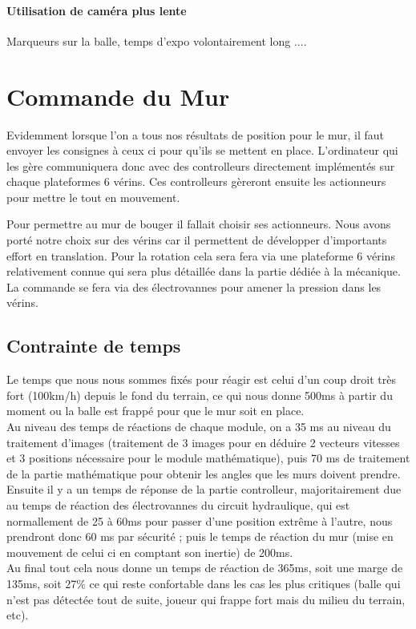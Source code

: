 \subsubsection{Utilisation de caméra plus lente}

Marqueurs sur la balle, temps d'expo volontairement long .... 



\chapter{Commande du Mur}

Evidemment lorsque l'on a tous nos résultats de position pour le mur, il faut envoyer les consignes à ceux ci pour qu'ils se mettent en place. L'ordinateur qui les gère communiquera donc avec des controlleurs directement implémentés sur chaque plateformes 6 vérins. Ces controlleurs gèreront ensuite les actionneurs pour mettre le tout en mouvement. 

Pour permettre au mur de bouger il fallait choisir ses actionneurs. Nous avons porté notre choix sur des vérins car il permettent de développer d'importants effort en translation. Pour la rotation cela sera fera via une plateforme 6 vérins relativement connue qui sera plus détaillée dans la partie dédiée à la mécanique. La commande se fera via des électrovannes pour amener la pression dans les vérins.

\section{Contrainte de temps}

Le temps que nous nous sommes fixés pour réagir est celui d'un coup droit très fort (100km/h) depuis le fond du terrain, ce qui nous donne 500ms à partir du moment ou la balle est frappé pour que le mur soit en place. \\
Au niveau des temps de réactions de chaque module, on a 35 ms au niveau du traitement d'images (traitement de 3 images pour en déduire 2 vecteurs vitesses et 3 positions nécessaire pour le module mathématique), puis 70 ms de traitement de la partie mathématique pour obtenir les angles que les murs doivent prendre. Ensuite il y a un temps de réponse de la partie controlleur, majoritairement due au temps de réaction des électrovannes du circuit hydraulique, qui est normallement de 25 à 60ms pour passer d'une position extrême à l'autre, nous prendront donc 60 ms par sécurité ; puis le temps de réaction du mur (mise en mouvement de celui ci en comptant son inertie) de 200ms.\\
Au final tout cela nous donne un temps de réaction de 365ms, soit une marge de 135ms, soit 27\% ce qui reste confortable dans les cas les plus critiques (balle qui n'est pas détectée tout de suite, joueur qui frappe fort mais du milieu du terrain, etc).


